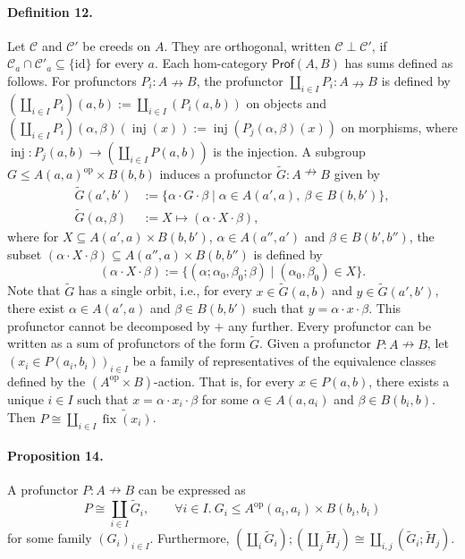 \documentclass[10pt,a4paper]{article}
\newcommand{\pf}{\mathrel{\nrightarrow}}
\begin{document}
\paragraph{Definition 12.} Let $\mathcal C$ and $\mathcal C'$ be creeds on $A$. They are orthogonal, written $\mathcal C\perp\mathcal C'$, if $\mathcal C_a\cap\mathcal C'_a\subseteq\{\mathrm{id}\}$ for every $a$.
Each hom-category $\mathsf{Prof}(A,B)$ has sums defined as follows. For profunctors $P_i:A\pf B$, the profunctor $\coprod_{i\in I}P_i:A\pf B$ is defined by $(\coprod_{i\in I}P_i)(a,b):=\coprod_{i\in I}(P_i(a,b))$ on objects and $(\coprod_{i\in I}P_i)(\alpha,\beta)(\operatorname{inj}(x)):=\operatorname{inj}(P_j(\alpha,\beta)(x))$ on morphisms, where $\operatorname{inj}:P_j(a,b)\to(\coprod_{i\in I}P(a,b))$ is the injection.
A subgroup $G\le A(a,a)^{\mathrm{op}}\times B(b,b)$ induces a profunctor $\widetilde G:A\pf B$ given by
\[
\begin{aligned}
\widetilde G(a',b')&:=\{\alpha\cdot G\cdot\beta\mid\alpha\in A(a',a),\ \beta\in B(b,b')\},\\
\widetilde G(\alpha,\beta)&:=X\mapsto(\alpha\cdot X\cdot\beta),
\end{aligned}
\]
where for $X\subseteq A(a',a)\times B(b,b')$, $\alpha\in A(a'',a')$ and $\beta\in B(b',b'')$, the subset $(\alpha\cdot X\cdot\beta)\subseteq A(a'',a)\times B(b,b'')$ is defined by
\[
(\alpha\cdot X\cdot\beta):=\{(\alpha;\alpha_0,\beta_0;\beta)\mid(\alpha_0,\beta_0)\in X\}.
\]
Note that $\widetilde G$ has a single orbit, i.e., for every $x\in\widetilde G(a,b)$ and $y\in\widetilde G(a',b')$, there exist $\alpha\in A(a',a)$ and $\beta\in B(b,b')$ such that $y=\alpha\cdot x\cdot\beta$. This profunctor cannot be decomposed by $+$ any further.
Every profunctor can be written as a sum of profunctors of the form $\widetilde G$. Given a profunctor $P:A\pf B$, let $(x_i\in P(a_i,b_i))_{i\in I}$ be a family of representatives of the equivalence classes defined by the $(A^{\mathrm{op}}\times B)$-action. That is, for every $x\in P(a,b)$, there exists a unique $i\in I$ such that $x=\alpha\cdot x_i\cdot\beta$ for some $\alpha\in A(a,a_i)$ and $\beta\in B(b_i,b)$. Then $P\cong\coprod_{i\in I}\widetilde{\operatorname{fix}(x_i)}$.
\paragraph{Proposition 14.} A profunctor $P:A\pf B$ can be expressed as
\[
P\cong\coprod_{i\in I}\widetilde G_i,\qquad
\forall i\in I.\ G_i\le A^{\mathrm{op}}(a_i,a_i)\times B(b_i,b_i)
\]
for some family $(G_i)_{i\in I}$. Furthermore,
$(\coprod_i\widetilde G_i);(\coprod_j\widetilde H_j)\cong\coprod_{i,j}(\widetilde G_i;\widetilde H_j)$.
\end{document}
